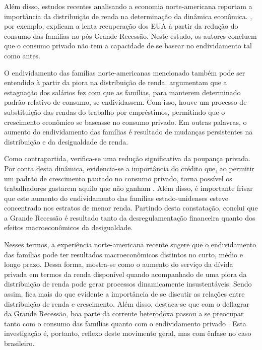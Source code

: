 Além disso, estudos recentes analisando a economia norte-americana reportam a importância da distribuição de renda na determinação da dinâmica econômica. \textcite{grossmann-wirth_role_2018}, por exemplo, explicam a lenta recuperação dos EUA à partir da redução do consumo das famílias no pós Grande Recessão. Neste estudo, os autores concluem que o consumo privado não tem a capacidade de se basear no endividamento tal como antes.

O endividamento das famílias norte-americanas mencionado também pode ser entendido à partir da piora na distribuição de renda. \textcite{barba_rising_2009} argumentam que a estagnação dos salários fez com que as famílias, para manterem determinado padrão relativo de consumo, se endividassem. Com isso, houve um processo de substituição das rendas do trabalho por empréstimos, permitindo que o crescimento econômico se baseasse no consumo privado. Em outras palavras, o aumento do endividamento das famílias é resultado de mudanças persistentes na distribuição e da desigualdade de renda. 


Como contrapartida, verifica-se uma redução significativa da poupança privada. Por conta desta dinâmica, evidencia-se a importância do crédito que, ao permitir um padrão de crescimento pautado no consumo privado, torna possível os trabalhadores gastarem aquilo que não ganham \cite{serrano_trabajadores_2008}. 
Além disso, é importante frisar que este aumento do endividamento das famílias estado-uni\-denses esteve concentrado nos estratos de menor renda. Partindo desta constatação, \textcite{stockhammer_rising_2015} conclui que a Grande Recessão é resultado tanto da desregulamentação financeira quanto dos efeitos macroeconômicos da desigualdade. 

Nesses termos, a experiência norte-americana recente sugere que o endividamento das famílias pode ter resultados macroeconômicos distintos no curto, médio e longo prazo. 
Dessa forma, mostra-se como o aumento do serviço da dívida privada em termos da renda disponível quando acompanhado de uma piora da distribuição de renda pode gerar processos dinamicamente insustentáveis. Sendo assim, fica mais do que evidente a importância de se discutir as relações entre distribuição de renda e crescimento.
Além disso, destaca-se que com o deflagrar da Grande Recessão, boa parte da corrente heterodoxa passou a se preocupar tanto com o consumo das famílias quanto com o endividamento privado \cite{brochier_macroeconomics_2017}.  Esta investigação é, portanto, reflexo deste movimento geral, mas com ênfase no caso brasileiro.

